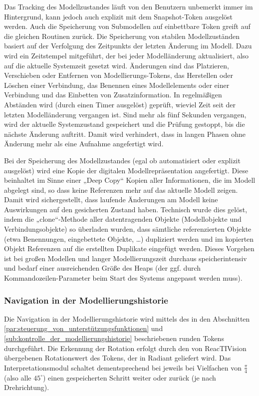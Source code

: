 Das Tracking des Modellzustandes läuft von den Benutzern unbemerkt immer im Hintergrund, kann jedoch auch explizit mit dem Snapshot-Token ausgelöst werden. Auch die Speicherung von Submodellen auf einbettbare Token greift auf die gleichen Routinen zurück. Die Speicherung von stabilen Modellzuständen basiert auf der Verfolgung des Zeitpunkts der letzten Änderung im Modell. Dazu wird ein Zeitstempel mitgeführt, der bei jeder Modelländerung aktualisiert, also auf die aktuelle Systemzeit gesetzt wird. Änderungen sind das Platzieren, Verschieben oder Entfernen von Modellierungs-Tokens, das Herstellen oder Löschen einer Verbindung, das Benennen eines Modellelements oder einer Verbindung und das Einbetten von Zusatzinformation. In regelmäßigen Abständen wird (durch einen Timer ausgelöst) geprüft, wieviel Zeit seit der letzten Modelländerung vergangen ist. Sind mehr als fünf Sekunden vergangen, wird der aktuelle Systemzustand gespeichert und die Prüfung gestoppt, bis die nächste Änderung auftritt. Damit wird verhindert, dass in langen Phasen ohne Änderung mehr als eine Aufnahme angefertigt wird.

Bei der Speicherung des Modellzustandes (egal ob automatisiert oder explizit ausgelöst) wird eine Kopie der digitalen Modellrepräsentation angefertigt. Diese beinhaltet im Sinne einer „Deep Copy“ Kopien aller Informationen, die im Modell abgelegt sind, so dass keine Referenzen mehr auf das aktuelle Modell zeigen. Damit wird sichergestellt, dass laufende Änderungen am Modell keine Auswirkungen auf den gesicherten Zustand haben. Technisch wurde dies gelöst, indem die „clone“-Methode aller datentragenden Objekte (Modellobjekte und Verbindungsobjekte) so überladen wurden, dass sämtliche referenzierten Objekte (etwa Benennungen, eingebettete Objekte, \ldots) dupliziert werden und im kopierten Objekt Referenzen auf die erstellten Duplikate eingefügt werden. Dieses Vorgehen ist bei großen Modellen und langer Modellierungszeit durchaus speicherintensiv und bedarf einer ausreichenden Größe des Heaps (der ggf. durch Kommandozeilen-Parameter beim Start des Systems angepasst werden muss).

\subsubsection{Navigation in der Modellierungshistorie} %
\label{ssub:navigation_durch_die_modellierungshistorie}

Die Navigation in der Modellierungshistorie wird mittels des in den Abschnitten \ref{par:steuerung_von_unterstützungsfunktionen} und \ref{sub:kontrolle_der_modellierungshistorie} beschriebenen runden Tokens durchgeführt. Die Erkennung der Rotation erfolgt durch den von ReacTIVision übergebenen Rotationswert des Tokens, der in Radiant geliefert wird. Das Interpretationsmodul schaltet dementsprechend bei jeweils bei Vielfachen von $\frac{\pi}{4}$ (also alle $45^\circ$) einen gespeicherten Schritt weiter oder zurück (je nach Drehrichtung).

